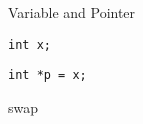 \begin{frame}{}
  \centerline{\Large Variable and Pointer}
\end{frame}

\begin{frame}[fragile]{}
  \begin{lstlisting}[style = CStyle]
                  int x;
  \end{lstlisting}
\end{frame}

\begin{frame}[fragile]{}
  \begin{lstlisting}[style = CStyle]
                int *p = x;
  \end{lstlisting}
\end{frame}

\begin{frame}[fragile]{}
  swap
\end{frame}
